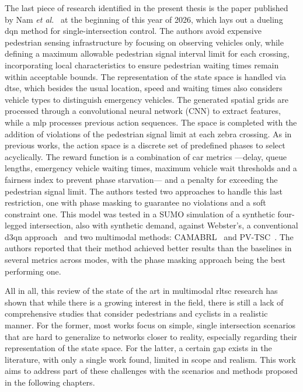 \noindent The last piece of research identified in the present thesis is the paper published by Nam \textit{et al.}~\cite{Nam2026} at the beginning of this year of 2026, which lays out a dueling \gls{dqn} method for single-intersection control. The authors avoid expensive pedestrian sensing infrastructure by focusing on observing vehicles only, while defining a maximum allowable pedestrian signal interval limit for each crossing, incorporating
local characteristics to ensure pedestrian waiting times remain
within acceptable bounds. The representation of the state space is handled via \gls{dtse}, which besides the usual location, speed and waiting times also considers vehicle types to distinguish emergency vehicles. The generated spatial grids are processed through a convolutional neural network (CNN) to extract features, while a \gls{mlp} processes previous action sequences. The space is completed with the addition of violations of the pedestrian signal limit at each zebra crossing. As in previous works, the action space is a discrete set of predefined phases to select acyclically. The reward function is a combination of car metrics —delay, queue lengths, emergency vehicle waiting times, maximum vehicle wait thresholds and a fairness index to prevent phase starvation— and a penalty for exceeding the pedestrian signal limit. The authors tested two approaches to handle this last restriction, one with phase masking to guarantee no violations and a soft constraint one. This model was tested in a SUMO simulation of a synthetic four-legged intersection, also with synthetic demand, against Webster's, a conventional \gls{d3qn} approach~\cite{Liang2019} and two multimodal methods: CAMABRL~\cite{Zhu2022} and PV-TSC~\cite{Xu2023}. The authors reported that their method achieved better results than the baselines in several metrics across modes, with the phase masking approach being the best performing one.

\medskip

\noindent All in all, this review of the state of the art in multimodal \gls{rltsc} research has shown that while there is a growing interest in the field, there is still a lack of comprehensive studies that consider pedestrians and cyclists in a realistic manner. For the former, most works focus on simple, single intersection scenarios that are hard to generalize to networks closer to reality, especially regarding their representation of the state space. For the latter, a certain gap exists in the literature, with only a single work found,  limited in scope and realism. This work aims to address part of these challenges with the scenarios and methods proposed in the following chapters.